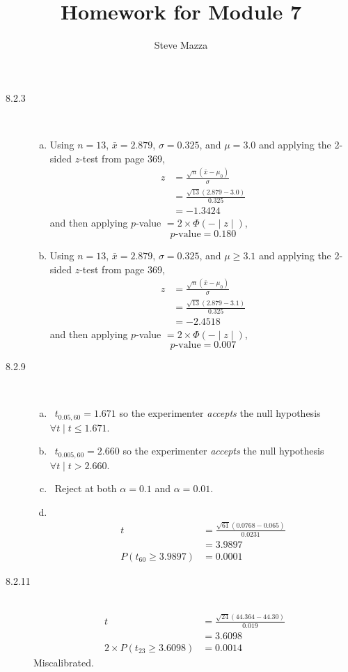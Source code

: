 \documentclass[letterpaper,10pt]{article}
\title{Homework for Module 7}
\author{Steve Mazza}
\begin{document}
\maketitle

\begin{description}
\item[8.2.3]\ 
\begin{enumerate}[a)]
\item Using $n=13$, $\bar{x}=2.879$, $\sigma=0.325$, and $\mu=3.0$ and applying the 2-sided $z$-test from page 369,
\begin{align*}
z &= \frac{\sqrt{n}(\bar{x}-\mu_{0})}{\sigma} \\
&= \frac{\sqrt{13}(2.879-3.0)}{0.325} \\
&= -1.3424
\end{align*}
and then applying $p$-value $=2\times\Phi(-\mid z\mid)$,
\[
p\mbox{-value} = 0.180
\]

\item Using $n=13$, $\bar{x}=2.879$, $\sigma=0.325$, and $\mu\geq3.1$ and applying the 2-sided $z$-test from page 369,
\begin{align*}
z &= \frac{\sqrt{n}(\bar{x}-\mu_{0})}{\sigma} \\
&= \frac{\sqrt{13}(2.879-3.1)}{0.325} \\
&= -2.4518
\end{align*}
and then applying $p$-value $=2\times\Phi(-\mid z\mid)$,
\[
p\mbox{-value} = 0.007
\]
\end{enumerate}

\item[8.2.9]\ 
\begin{enumerate}[a)]
\item\ $t_{0.05,60}=1.671$ so the experimenter \emph{accepts} the null hypothesis $\forall t\mid t\leq 1.671$.
\item\ $t_{0.005,60}=2.660$ so the experimenter \emph{accepts} the null hypothesis $\forall t\mid t > 2.660$.
\item\ Reject at both $\alpha=0.1$ and $\alpha=0.01$.
\item\ 
\begin{align*}
t&=\frac{\sqrt{61}(0.0768-0.065)}{0.0231} \\
&= 3.9897 \\
P(t_{60}\geq 3.9897)&=0.0001
\end{align*}
\end{enumerate}

\item[8.2.11]\ 
\begin{align*}
t&= \frac{\sqrt{24}(44.364-44.30)}{0.019} \\
&= 3.6098 \\
2\times P(t_{23}\geq 3.6098)&= 0.0014
\end{align*}
Miscalibrated.


\end{description}
\end{document}
